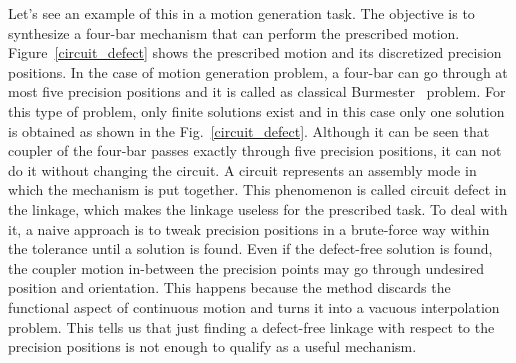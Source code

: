 \documentclass[twocolumn,10pt]{asme2ej}
\begin{document}
Let's see an example of this in a motion generation task.
The objective is to synthesize a four-bar mechanism that can perform the prescribed motion.
Figure~\ref{circuit_defect} shows the prescribed motion and its discretized precision positions.
In the case of motion generation problem, a four-bar can go through at most five precision positions and it is called as classical Burmester~\cite{Burmester86} problem.
For this type of problem, only finite solutions exist and in this case only one solution is obtained as shown in the Fig.~\ref{circuit_defect}.
Although it can be seen that coupler of the four-bar passes exactly through five precision positions, it can not do it without changing the circuit.
A circuit represents an assembly mode in which the mechanism is put together.
This phenomenon is called circuit defect in the linkage, which makes the linkage useless for the prescribed task.
To deal with it, a naive approach is to tweak precision positions in a brute-force way within the tolerance until a solution is found.
Even if the defect-free solution is found, the coupler motion in-between the precision points may go through undesired position and orientation.
This happens because the method discards the functional aspect of continuous motion and turns it into a vacuous interpolation problem.
This tells us that just finding a defect-free linkage with respect to the precision positions is not enough to qualify as a useful mechanism.
\end{document}
